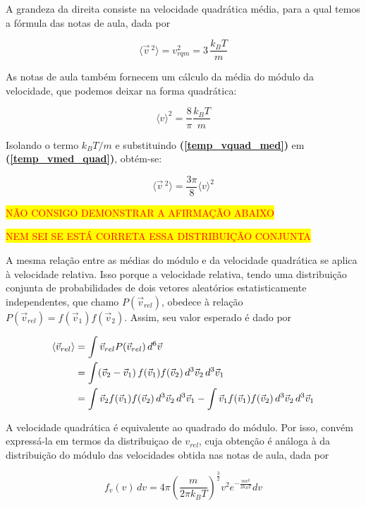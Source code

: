 \documentclass[12pt]{extarticle} %
\begin{document}
A grandeza da direita consiste na velocidade quadrática média, para a qual temos a fórmula das notas de aula, dada por

\begin{equation}
    \langle\vec{v}\,^2\rangle=v_{rqm}^2=3\,\frac{k_BT}{m}
\label{temp_vquad_med}
\end{equation}

As notas de aula também fornecem um cálculo da média do módulo da velocidade, que podemos deixar na forma quadrática:

\begin{equation}
    \langle v \rangle ^2 = \frac{8}{\pi}\frac{k_BT}{m}
\label{temp_vmed_quad}
\end{equation}

Isolando o termo $k_BT/m$ e substituindo \textbf{(\ref{temp_vquad_med})} em \textbf{(\ref{temp_vmed_quad})}, obtém-se:

$$\langle\vec{v}\,^2\rangle = \frac{3\pi}{8} \langle v \rangle ^2$$

\textcolor{red}{\colorbox{yellow}{NÃO CONSIGO DEMONSTRAR A AFIRMAÇÃO ABAIXO}}
\par
\textcolor{red}{\colorbox{yellow}{NEM SEI SE ESTÁ CORRETA ESSA DISTRIBUIÇÃO CONJUNTA}}

A mesma relação entre as médias do módulo e da velocidade quadrática se aplica à velocidade relativa. Isso porque a velocidade relativa, tendo uma distribuição conjunta de probabilidades de dois vetores aleatórios estatisticamente independentes, que chamo $P(\vec{v}_{rel})$, obedece à relação $P(\vec{v}_{rel})=f(\vec{v}_1)f(\vec{v}_2)$. Assim, seu valor esperado é dado por

\begin{align}
    \langle\vec{v}_{rel}\rangle &= \int \vec{v}_{rel}P(\vec{v}_{rel}) \,d^6 \vec{v} \notag \\ 
    &= \int (\vec{v}_2-\vec{v}_1)\,f(\vec{v}_1)f(\vec{v}_2)\,d^3\vec{v}_2\,d^3\vec{v}_1 \notag \\
    &= \int \vec{v}_2 f(\vec{v}_1)f(\vec{v}_2)\,d^3\vec{v}_2\,d^3\vec{v}_1-\int\vec{v}_1 f(\vec{v}_1)f(\vec{v}_2)\,d^3\vec{v}_2\,d^3\vec{v}_1
\label{temp_v_rel}
\end{align}

A velocidade quadrática é equivalente ao quadrado do módulo. Por isso, convém expressá-la em termos da distribuiçao de $v_{rel}$, cuja obtenção é análoga à da distribuição do módulo das velocidades obtida nas notas de aula, dada por

\begin{equation}
    f_v(v)\,dv = 4\pi\left(\frac{m}{2\pi k_BT}\right)^{\frac{3}{2}}v^2e^{-\frac{mv^2}{2k_BT}}dv
    \label{Mx_mod}
\end{equation}
\end{document}
